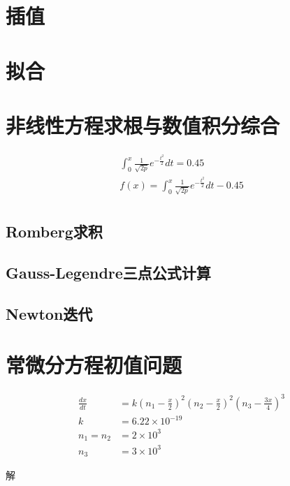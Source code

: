 \documentclass{article}
\begin{document}
\section{插值}

\section{拟合}

\section{非线性方程求根与数值积分综合}
\begin{align*}
\int_0^x\frac{1}{\sqrt{2p}}e^{-\frac{t^2}{2}}dt = 0.45 \\
f(x) = \int_0^x\frac{1}{\sqrt{2p}}e^{-\frac{t^2}{2}}dt - 0.45 \\
\end{align*}
\subsection{Romberg求积}

\subsection{Gauss-Legendre三点公式计算}

\subsection{Newton迭代}

\section{常微分方程初值问题}
\begin{align*}
    \frac{dx}{dt} & = k(n_1-\frac{x}{2})^2(n_2-\frac{x}{2})^2(n_3-\frac{3x}{4})^3 \\
    k & = 6.22\times 10^{-19}  \\
    n_1 = n_2 & = 2 \times 10^3  \\
    n_3 & = 3 \times 10^3  
\end{align*}

解
\end{document}
